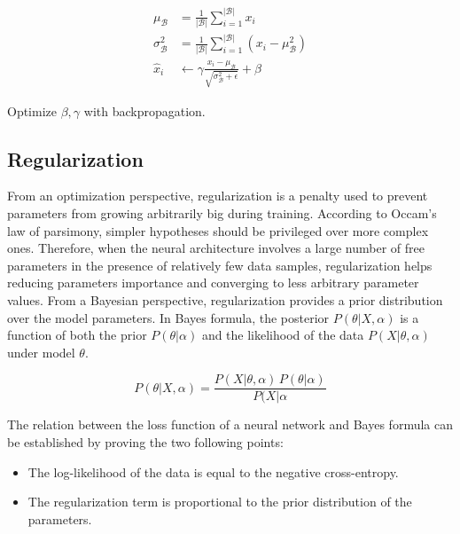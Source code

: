         \begin{equation}
            \begin{split}
                \mu_{\mathcal{B}} & = \frac{1}{\vert\mathcal{B}\vert} \sum\limits_{i=1}^{\vert\mathcal{B}\vert} x_i \\
                \sigma_{\mathcal{B}}^2 & = \frac{1}{\vert\mathcal{B}\vert} \sum\limits_{i=1}^{\vert\mathcal{B}\vert} (x_i - \mu_{\mathcal{B}}^2) \\
                \hat{x}_i & \leftarrow \gamma \frac{x_i - \mu_{\mathcal{B}}}{\sqrt{\sigma_{\mathcal{B}}^2 + \epsilon}} + \beta
            \end{split}
        \end{equation}

        Optimize $\beta, \gamma$ with backpropagation. \todo{}

    \subsection{Regularization}

	From an optimization perspective, regularization is a penalty used to prevent 
	parameters from growing arbitrarily big during training.
	According to Occam's law of parsimony, simpler hypotheses should be privileged over more complex ones.
	Therefore, when the neural architecture involves a large number of free parameters
	in the presence of relatively few data samples,
	regularization helps reducing parameters importance and converging to less arbitrary parameter values.
	From a Bayesian perspective, regularization provides a prior distribution over the model parameters.
	In Bayes formula, the posterior $P(\theta \vert X, \alpha)$ is a function of both the prior
	$P(\theta \vert \alpha)$ and the likelihood of the data $P(X \vert \theta, \alpha)$ under model $\theta$.

	\begin{equation}
	    P(\theta \vert X, \alpha) = \frac{P(X \vert \theta, \alpha)\,P(\theta \vert \alpha)}{P(X \vert \alpha}
	\end{equation}

	The relation between the loss function of a neural network and Bayes formula can be established
	by proving the two following points:

	\begin{itemize}
	    \item The log-likelihood of the data is equal to the negative cross-entropy.
	    \item The regularization term is proportional to the prior distribution of the parameters.
	\end{itemize}

